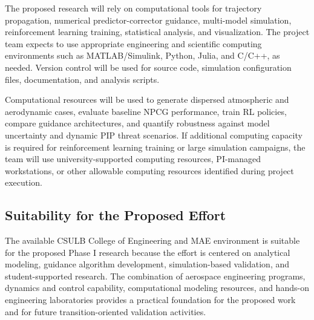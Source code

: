 The proposed research will rely on computational tools for trajectory propagation, numerical predictor-corrector guidance, multi-model simulation, reinforcement learning training, statistical analysis, and visualization. The project team expects to use appropriate engineering and scientific computing environments such as MATLAB/Simulink, Python, Julia, and C/C++, as needed. Version control will be used for source code, simulation configuration files, documentation, and analysis scripts.

Computational resources will be used to generate dispersed atmospheric and aerodynamic cases, evaluate baseline NPCG performance, train RL policies, compare guidance architectures, and quantify robustness against model uncertainty and dynamic PIP threat scenarios. If additional computing capacity is required for reinforcement learning training or large simulation campaigns, the team will use university-supported computing resources, PI-managed workstations, or other allowable computing resources identified during project execution.

\subsection{Suitability for the Proposed Effort}

The available CSULB College of Engineering and MAE environment is suitable for the proposed Phase I research because the effort is centered on analytical modeling, guidance algorithm development, simulation-based validation, and student-supported research. The combination of aerospace engineering programs, dynamics and control capability, computational modeling resources, and hands-on engineering laboratories provides a practical foundation for the proposed work and for future transition-oriented validation activities.
